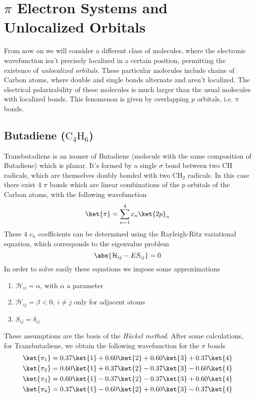 \documentclass[a4paper, 11pt]{book}
\newcommand{\1}{\opr{\mathds{1}}}
\theoremstyle{plain}
\begin{document}
	\section{$\pi$ Electron Systems and Unlocalized Orbitals}
	From now on we will consider a different class of molecules, where the electronic wavefunction isn't precisely localized in a certain position, permitting the existence of \textit{unlocalized orbitals}. These particular molecules include chains of Carbon atoms, where double and single bonds alternate and aren't localized. The electrical polarizability of these molecules is much larger than the usual molecules with localized bonds. This fenomenon is given by overlapping $p$ orbitals, i.e. $\pi$ bonds.
	\subsection{Butadiene ($\mathrm{C_4H_6}$)}
	Transbutadiene is an isomer of Butadiene (molecule with the same composition of Butadiene) which is planar. It's formed by a single $\sigma$ bond between two $\mathrm{CH}$ radicals, which are themselves doubly bonded with two $\mathrm{CH_2}$ radicals. In this case there exist 4 $\pi$ bonds which are linear combinations of the $p$ orbitals of the Carbon atoms, with the following wavefunction
	\begin{equation}
		\ket{\pi}=\sum_{n=1}^4c_n\ket{2p}_n
		\label{eq:nonlocalizedbutadiene}
	\end{equation}
	These 4 $c_n$ coefficients can be determined using the Rayleigh-Ritz variational equation, which corresponds to the eigenvalue problem
	\begin{equation*}
		\abs{\mathcal{H}_{ij}-ES_{ij}}=0
	\end{equation*}
	In order to solve easily these equations we impose some approximations
	\begin{enumerate}
	\item $\mathcal{H}_{ii}=\alpha$, with $\alpha$ a parameter
	\item $\mathcal{H}_{ij}=\beta<0,\ i\ne j$ only for adjacent atoms
	\item $S_{ij}=\delta_{ij}$
	\end{enumerate}
	These assumptions are the basis of the \textit{Hückel method}. After some calculations, for Transbutadiene, we obtain the following wavefunction for the $\pi$ bonds
	\begin{equation}
		\begin{aligned}
			\ket{\pi_1}&=0.37\ket{1}+0.60\ket{2}+0.60\ket{3}+0.37\ket{4}\\
			\ket{\pi_2}&=0.60\ket{1}+0.37\ket{2}-0.37\ket{3}-0.60\ket{4}\\
			\ket{\pi_3}&=0.60\ket{1}-0.37\ket{2}-0.37\ket{3}+0.60\ket{4}\\
			\ket{\pi_4}&=0.37\ket{1}-0.60\ket{2}+0.60\ket{3}-0.37\ket{4}
		\end{aligned}
		\label{eq:butadienewf}
	\end{equation}
\end{document}
